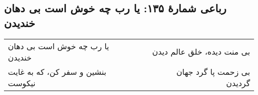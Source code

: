 \begin{center}
\section*{رباعی شمارهٔ ۱۳۵: یا رب چه خوش است بی دهان خندیدن}
\label{sec:135}
\begin{longtable}{l p{0.5cm} r}
یا رب چه خوش است بی دهان خندیدن
&&
بی منت دیده، خلق عالم دیدن
\\
بنشین و سفر کن، که به غایت نیکوست
&&
بی زحمت پا گرد جهان گردیدن
\\
\end{longtable}
\end{center}
